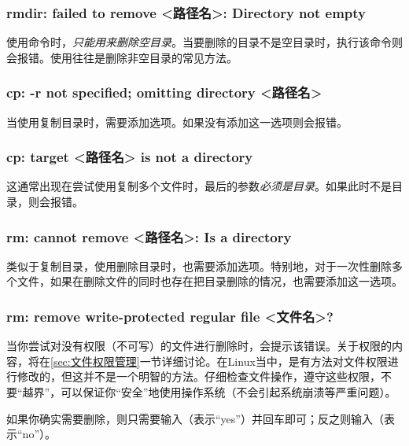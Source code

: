 \subsubsection{rmdir: failed to remove <路径名>: Directory not empty}

使用命令时，\emph{只能用来删除空目录}。当要删除的目录不是空目录时，执行该命令则会报错。使用往往是删除非空目录的常见方法。

\subsubsection{cp: -r not specified; omitting directory <路径名>}

当使用复制目录时，需要添加选项。如果没有添加这一选项则会报错。

\subsubsection{cp: target <路径名> is not a directory}

这通常出现在尝试使用复制多个文件时，最后的参数\emph{必须是目录}。如果此时不是目录，则会报错。

\subsubsection{rm: cannot remove <路径名>: Is a directory}

类似于复制目录，使用删除目录时，也需要添加选项。特别地，对于一次性删除多个文件，如果在删除文件的同时也存在把目录删除的情况，也需要添加这一选项。

\subsubsection{rm: remove write-protected regular file <文件名>? }

当你尝试对没有权限（不可写）的文件进行删除时，会提示该错误。关于权限的内容，将在\ref{sec:文件权限管理}一节详细讨论。在Linux当中，是有方法对文件权限进行修改的，但这并不是一个明智的方法。仔细检查文件操作，遵守这些权限，不要“越界”，可以保证你“安全”地使用操作系统（不会引起系统崩溃等严重问题）。

如果你确实需要删除，则只需要输入（表示“yes”）并回车即可；反之则输入（表示“no”）。

